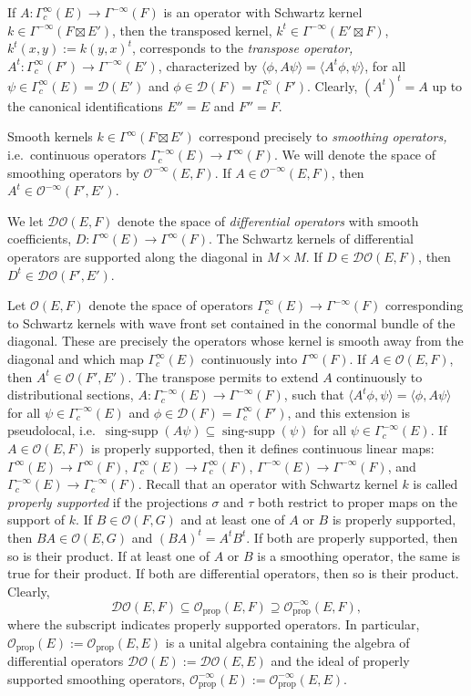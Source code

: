 \documentclass[reqno,12pt]{amsart}
\DeclareMathOperator\singsupp{sing-supp}
\newcommand{\DO}{\mathcal D\mathcal O}
\newcommand\prop{\textrm{prop}}
\theoremstyle{plain}
\theoremstyle{definition}
\begin{document}
If $A\colon\Gamma^\infty_c(E)\to\Gamma^{-\infty}(F)$ is an operator with Schwartz kernel $k\in\Gamma^{-\infty}(F\boxtimes E')$, then the transposed kernel, $k^t\in\Gamma^{-\infty}(E'\boxtimes F)$, $k^t(x,y):=k(y,x)^t$, corresponds to the \emph{transpose operator,} $A^t\colon\Gamma^\infty_c(F')\to\Gamma^{-\infty}(E')$, characterized by $\langle\phi,A\psi\rangle=\langle A^t\phi,\psi\rangle$, for all $\psi\in\Gamma^\infty_c(E)=\mathcal D(E')$ and $\phi\in\mathcal D(F)=\Gamma^\infty_c(F')$.
Clearly, $(A^t)^t=A$ up to the canonical identifications $E''=E$ and $F''=F$.


Smooth kernels $k\in\Gamma^\infty(F\boxtimes E')$ correspond precisely to \emph{smoothing operators,} i.e.\ continuous operators $\Gamma^{-\infty}_c(E)\to\Gamma^\infty(F)$.
We will denote the space of smoothing operators by $\mathcal O^{-\infty}(E,F)$.
If $A\in\mathcal O^{-\infty}(E,F)$, then $A^t\in\mathcal O^{-\infty}(F',E')$.


We let $\DO(E,F)$ denote the space of \emph{differential operators} with smooth coefficients, $D\colon\Gamma^\infty(E)\to\Gamma^\infty(F)$.
The Schwartz kernels of differential operators are supported along the diagonal in $M\times M$.
If $D\in\DO(E,F)$, then $D^t\in\DO(F',E')$.


Let $\mathcal O(E,F)$ denote the space of operators $\Gamma^\infty_c(E)\to\Gamma^{-\infty}(F)$ corresponding to Schwartz kernels with wave front set contained in the conormal bundle of the diagonal.
These are precisely the operators whose kernel is smooth away from the diagonal and which map $\Gamma^\infty_c(E)$ continuously into $\Gamma^\infty(F)$.
If $A\in\mathcal O(E,F)$, then $A^t\in\mathcal O(F',E')$.
The transpose permits to extend $A$ continuously to distributional sections, $A\colon\Gamma^{-\infty}_c(E)\to\Gamma^{-\infty}(F)$, such that $\langle A^t\phi,\psi\rangle=\langle\phi,A\psi\rangle$ for all $\psi\in\Gamma^{-\infty}_c(E)$ and $\phi\in\mathcal D(F)=\Gamma^\infty_c(F')$, and this extension is pseudolocal, i.e.\ $\singsupp(A\psi)\subseteq\singsupp(\psi)$
for all $\psi\in\Gamma^{-\infty}_c(E)$.
If $A\in\mathcal O(E,F)$ is properly supported, then it defines continuous linear maps:
$\Gamma^\infty(E)\to\Gamma^\infty(F)$,
$\Gamma^\infty_c(E)\to\Gamma^\infty_c(F)$,
$\Gamma^{-\infty}(E)\to\Gamma^{-\infty}(F)$, and
$\Gamma^{-\infty}_c(E)\to\Gamma^{-\infty}_c(F)$.
Recall that an operator with Schwartz kernel $k$ is called \emph{properly supported} if the projections $\sigma$ and $\tau$ both restrict to proper maps on the support of $k$.
If $B\in\mathcal O(F,G)$ and at least one of $A$ or $B$ is properly supported, then $BA\in\mathcal O(E,G)$ and $(BA)^t=A^tB^t$.
If both are properly supported, then so is their product.
If at least one of $A$ or $B$ is a smoothing operator, the same is true for their product.
If both are differential operators, then so is their product.
Clearly,
$$
\DO(E,F)\subseteq\mathcal O_\prop(E,F)\supseteq\mathcal O^{-\infty}_\prop(E,F),
$$
where the subscript indicates properly supported operators.
In particular, $\mathcal O_\prop(E):=\mathcal O_\prop(E,E)$ is a unital algebra containing the algebra of differential operators $\DO(E):=\DO(E,E)$
and the ideal of properly supported smoothing operators, $\mathcal O^{-\infty}_\prop(E):=\mathcal O^{-\infty}_\prop(E,E)$.
\end{document}
